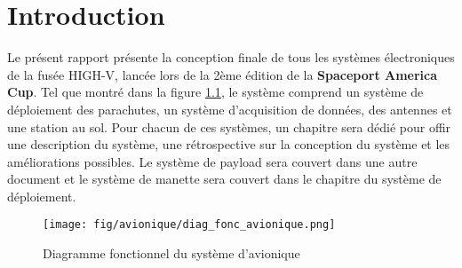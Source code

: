 \chapter{Introduction}
\label{chap:intro}

Le présent rapport présente la conception finale de tous les systèmes
électroniques de la fusée HIGH-V, lancée lors de la 2ème édition de la
\textbf{Spaceport America Cup}. Tel que montré dans la figure
\ref{f:diag_fonc_avionique}, le système comprend un système de déploiement des
parachutes, un système d'acquisition de données, des antennes et une station
au sol. Pour chacun de ces systèmes, un chapitre sera dédié pour offir une
description du système, une rétrospective sur la conception du système et les
améliorations possibles. Le système de payload sera couvert dans une autre
document et le système de manette sera couvert dans le chapitre du système
de déploiement.

\begin{figure}[H]
	\center
	\texttt{[image: fig/avionique/diag\_fonc\_avionique.png]}
	\caption{Diagramme fonctionnel du système d'avionique}
	\label{f:diag_fonc_avionique}
\end{figure}
